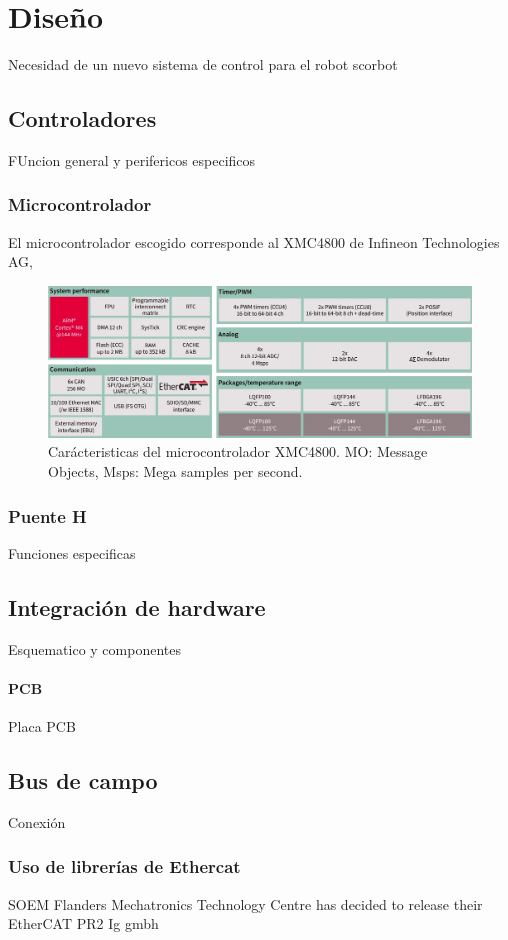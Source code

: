 \chapter{Diseño}

Necesidad de un nuevo sistema de control para el robot scorbot


\section{Controladores}

\label{cap3_controladores}

FUncion general y perifericos especificos

\subsection{Microcontrolador}

El microcontrolador escogido corresponde al XMC4800 de Infineon Technologies AG, 


\begin{figure}[ht]
  \centering
  \includegraphics[scale=.2]{img/cap3/xmc4800_data}
  \caption{Carácteristicas del microcontrolador XMC4800. MO: Message Objects, Msps: Mega samples per second.}
  \label{cap3_xmc4800_data}
\end{figure}

\subsection{Puente H}

Funciones especificas

\section{Integración de hardware}

Esquematico y componentes

\subsubsection{PCB}

Placa PCB

\section{Bus de campo}

Conexión

\subsection{Uso de librerías de Ethercat}

SOEM
Flanders Mechatronics Technology Centre has decided to release their EtherCAT PR2
Ig gmbh

